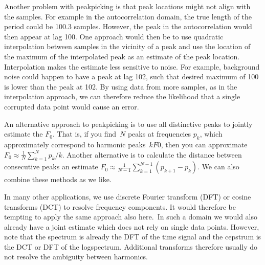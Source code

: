 \documentclass[letterpaper,10pt,english]{jupyterBook}
\begin{document}
\sphinxAtStartPar
Another problem with peak\sphinxhyphen{}picking is that peak locations might not align
with the samples. For example in the autocorrelation domain, the true
length of the period could be 100.3 samples. However, the peak in the
autocorrelation would then appear at lag 100. One approach would then be
to use quadratic interpolation between samples in the vicinity of a peak
and use the location of the maximum of the interpolated peak as an
estimate of the peak location. Interpolation makes the estimate less
sensitive to noise. For example, background noise could happen to have a
peak at lag 102, such that desired maximum of 100 is lower than the peak
at 102. By using data from more samples, as in the interpolation
approach, we can therefore reduce the likelihood that a single corrupted
data point would cause an error.

\sphinxAtStartPar
An alternative approach to peak\sphinxhyphen{}picking is to use all distinctive peaks
to jointly estimate the \(F_0\). That is, if you find \(N\) peaks at
frequencies \(p_{k}\), which approximately correspond to harmonic
peaks \(kF0\), then you can approximate \( F_0 \approx \frac1N
\sum_{k=1}^N p_k/k. \) Another alternative is to calculate the
distance between consecutive peaks an estimate \( F_0 \approx
\frac1{N-1} \sum_{k=1}^{N-1} (p_{k+1}-p_k). \) We can also combine
these methods as we like.

\sphinxAtStartPar
In many other applications, we use discrete Fourier transform (DFT) or
cosine transforms (DCT) to resolve frequency components. It would
therefore be tempting to apply the same approach also here. In such a
domain we would also already have a joint estimate which does not rely
on single data points. However, note that the spectrum is already the
DFT of the time signal and the cepstrum is the DCT or DFT of the
log\sphinxhyphen{}spectrum. Additional transforms therefore usually do not resolve the
ambiguity between harmonics.

\sphinxstepscope
\end{document}
